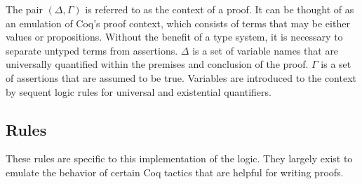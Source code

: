 \documentclass[12pt]{article}
\begin{document}
The pair $(\Delta, \Gamma)$ is referred to as the context of a proof.
It can be thought of as an emulation of Coq's proof context, which
consists of terms that may be either values or propositions.  Without
the benefit of a type system, it is necessary to separate untyped terms
from assertions. $\Delta$ is a set of variable names that are
universally quantified within the premises and conclusion of the proof.
$\Gamma$ is a set of assertions that are assumed to be true.  Variables
are introduced to the context by sequent logic rules for universal and
existential quantifiers.

\subsection{Rules}

These rules are specific to this implementation of the logic.  They
largely exist to emulate the behavior of certain Coq tactics that are
helpful for writing proofs.
\end{document}
